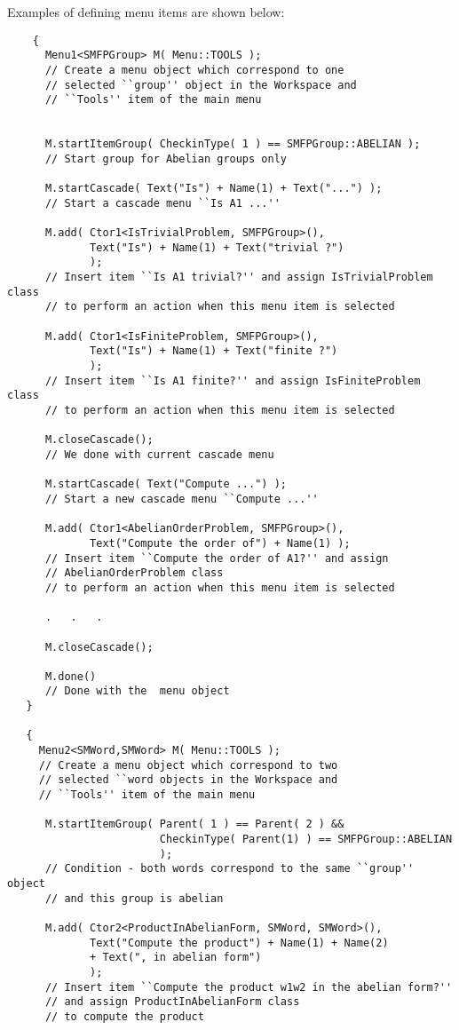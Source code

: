 \documentclass[12pt]{article}
\begin{document}
  Examples of defining menu items are shown below:
  \scriptsize
  \begin{verbatim}
    {
      Menu1<SMFPGroup> M( Menu::TOOLS );
      // Create a menu object which correspond to one
      // selected ``group'' object in the Workspace and 
      // ``Tools'' item of the main menu


      M.startItemGroup( CheckinType( 1 ) == SMFPGroup::ABELIAN );
      // Start group for Abelian groups only

      M.startCascade( Text("Is") + Name(1) + Text("...") );
      // Start a cascade menu ``Is A1 ...''

      M.add( Ctor1<IsTrivialProblem, SMFPGroup>(),
             Text("Is") + Name(1) + Text("trivial ?")
             );
      // Insert item ``Is A1 trivial?'' and assign IsTrivialProblem class
      // to perform an action when this menu item is selected

      M.add( Ctor1<IsFiniteProblem, SMFPGroup>(),
             Text("Is") + Name(1) + Text("finite ?")
             );
      // Insert item ``Is A1 finite?'' and assign IsFiniteProblem class
      // to perform an action when this menu item is selected

      M.closeCascade();
      // We done with current cascade menu

      M.startCascade( Text("Compute ...") );
      // Start a new cascade menu ``Compute ...''
      
      M.add( Ctor1<AbelianOrderProblem, SMFPGroup>(),
             Text("Compute the order of") + Name(1) );
      // Insert item ``Compute the order of A1?'' and assign
      // AbelianOrderProblem class
      // to perform an action when this menu item is selected

      .   .   .

      M.closeCascade();
      
      M.done()
      // Done with the  menu object
   }

   {
     Menu2<SMWord,SMWord> M( Menu::TOOLS );
     // Create a menu object which correspond to two
     // selected ``word objects in the Workspace and 
     // ``Tools'' item of the main menu

      M.startItemGroup( Parent( 1 ) == Parent( 2 ) &&
                        CheckinType( Parent(1) ) == SMFPGroup::ABELIAN
                        );
      // Condition - both words correspond to the same ``group'' object
      // and this group is abelian
      
      M.add( Ctor2<ProductInAbelianForm, SMWord, SMWord>(),
             Text("Compute the product") + Name(1) + Name(2)
             + Text(", in abelian form")
             );
      // Insert item ``Compute the product w1w2 in the abelian form?'' 
      // and assign ProductInAbelianForm class
      // to compute the product


\end{verbatim}
\end{document}
